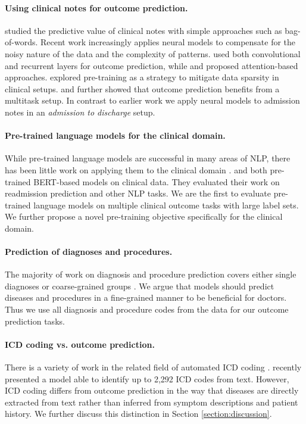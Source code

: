 \documentclass[11pt,a4paper]{article}
\begin{document}
\paragraph{Using clinical notes for outcome prediction.} \citet{whats-in-a-note} studied the predictive value of clinical notes with simple approaches such as bag-of-words. Recent work increasingly applies neural models to compensate for the noisy nature of the data and the complexity of patterns. \citet{hashir-mortality} used both convolutional and
recurrent layers for outcome prediction, while \citet{attention-notes} and \citet{MNN} proposed attention-based approaches. \citet{pretraining-substance-misuse} explored pre-training as a strategy to mitigate data sparsity in clinical setups. \citet{multitask-mortality} and \citet{multitask-patients} further showed that outcome prediction benefits from a multitask setup. In contrast to earlier work we apply neural models to admission notes in an \textit{admission to discharge} setup.

\paragraph{Pre-trained language models for the clinical \hbox{domain.}}
While pre-trained language models are successful in many areas of NLP, there has been little work on applying them to the clinical domain \cite{pretrained-models-survey}. \citet{alsentzer-clinical-bert} and \citet{huang-clinical-bert} both pre-trained BERT-based models on clinical data. They evaluated their work on readmission prediction and other NLP tasks. We are the first to evaluate pre-trained language models on multiple clinical outcome tasks with large label sets. We further propose a novel pre-training objective specifically for the clinical domain.

\paragraph{Prediction of diagnoses and procedures.} The majority of work on diagnosis and procedure prediction covers either single diagnoses \cite{deep-ehr,mime} or coarse-grained groups \cite{self-attention-enhance,sushil}. We argue that models should predict diseases and procedures in a fine-grained manner to be beneficial for doctors. Thus we use all diagnosis and procedure codes from the data for our outcome prediction tasks.

\paragraph{ICD coding vs. outcome prediction.}
There is a variety of work in the related field of automated ICD coding \cite{icd-coding1,icd-coding2}. \citet{bert-xml} recently presented a model able to identify up to 2,292 ICD codes from text. However, ICD coding differs from outcome prediction in the way that diseases are directly extracted from text rather than inferred from symptom descriptions and patient history. We further discuss this distinction in Section \ref{section:discussion}.
\end{document}
